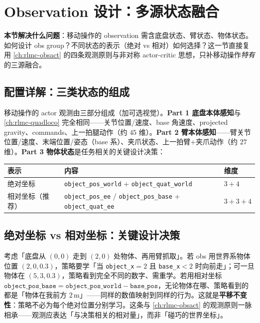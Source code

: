 \section{Observation 设计：多源状态融合}
\label{sec:rlmc-lm-obs}

\textbf{本节解决什么问题}：移动操作的 observation 需含底盘状态、臂状态、物体状态。如何设计 obs group？不同状态的表示（绝对 vs 相对）如何选择？这一节直接复用 \cref{ch:rlmc-obsact} 的四条观测原则与非对称 actor-critic 思想，只补移动操作\emph{特有}的三源融合。

\subsection{配置详解：三类状态的组成}
\label{sec:rlmc-lm-obs-three}

移动操作的 actor 观测由三部分组成（加可选视觉）。\textbf{Part 1 底盘本体感知}与 \cref{ch:rlmc-quadloco} 完全相同——关节位置/速度、base 角速度、projected gravity、commands、上一拍腿动作（约 $45$ 维）。\textbf{Part 2 臂本体感知}——臂关节位置/速度、末端位置/姿态（base 系）、夹爪状态、上一拍臂+夹爪动作（约 $27$ 维）。\textbf{Part 3 物体状态}是任务相关的关键设计决策：

\begin{center}
\small
\begin{tabular}{@{}lll@{}}
\toprule
表示 & 内容 & 维度 \\
\midrule
绝对坐标 & \texttt{object\_pos\_world} + \texttt{object\_quat\_world} & $3+4$ \\
相对坐标（推荐） & \texttt{object\_pos\_ee} / \texttt{object\_pos\_base} + \texttt{object\_quat\_ee} & $3+3+4$ \\
\bottomrule
\end{tabular}
\end{center}

\subsection{绝对坐标 vs 相对坐标：关键设计决策}
\label{sec:rlmc-lm-obs-rel}

\begin{insight}[相对坐标带来平移不变性]\label{ins:rlmc-lm-relcoord}
考虑「底盘从 $(0,0)$ 走到 $(2,0)$ 处物体、再用臂抓取」。若 obs 用世界系物体位置 $(2,0,0.3)$，策略要学「当 \texttt{object\_x}$=2$ 且 \texttt{base\_x}$<2$ 时向前走」；可一旦物体在 $(5,3,0.3)$，策略看到完全不同的数字、需重学。若用相对坐标 $\texttt{object\_pos\_base}=\texttt{object\_pos\_world}-\texttt{base\_pos}$，无论物体在哪、策略看到的都是「物体在我前方 $2\,$m」——同样的数值映射到同样的行为。这就是\textbf{平移不变性}：策略不必为每个绝对位置分别学习。这条与 \cref{ch:rlmc-obsact} 的观测原则一脉相承——观测应表达「与决策相关的相对量」，而非「碰巧的世界坐标」。
\end{insight}

